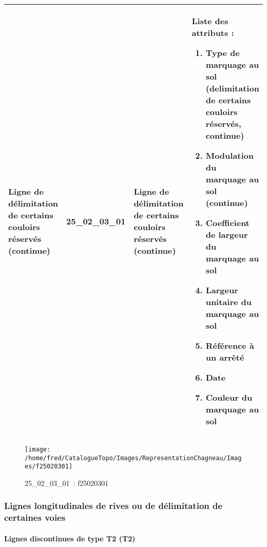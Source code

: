 \documentclass[12pt,titlepage]{book}
\begin{document}
\renewcommand{\arraystretch}{1.2}
\begin{supertabular}{|p{10cm}|c|p{13cm}|p{12cm}|}
 Ligne de délimitation de certains couloirs réservés (continue) & 25\_02\_03\_01 & Ligne de délimitation de certains couloirs réservés (continue) & Liste des attributs :
\begin{enumerate}
  \item Type de marquage au sol (delimitation de certains couloirs réservés, continue)  \item Modulation du marquage au sol (continue)  \item Coefficient de largeur du marquage au sol  \item Largeur unitaire du marquage au sol  \item Référence à un arrêté  \item Date  \item Couleur du marquage au sol\end{enumerate}
\\
\hline
\end{supertabular}
\begin{figure}[h!]
  \hfill         %
  \begin{minipage}[t]{3cm}
    \begin{center}
      \texttt{[image: /home/fred/CatalogueTopo/Images/RepresentationChagneau/Images/f25020301]}
      \caption[~25\_02\_03\_01]{\small{25\_02\_03\_01~:} \tiny{f25020301}}\label{f25020301}
    \end{center}
  \end{minipage}
\end{figure}

\subsubsection{\large Lignes longitudinales de rives ou de délimitation de certaines voies}
\paragraph{Lignes discontinues de type T2 (T2)}
\noindent
\vspace{\baselineskip}
\end{document}

